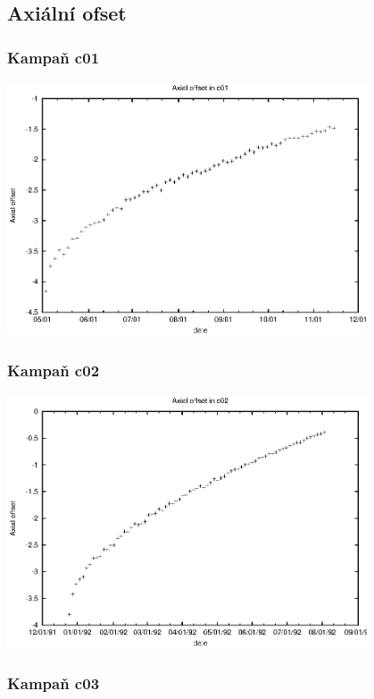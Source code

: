 \documentclass[a4paper,twoside,11pt]{article}
\begin{document}
\subsection{Axiální ofset}



\subsubsection{Kampaň c01}

\begin{center}
\includegraphics[width=0.8\textwidth]{data_c01_ao.eps}
\end{center}


\subsubsection{Kampaň c02}

\begin{center}
\includegraphics[width=0.8\textwidth]{data_c02_ao.eps}
\end{center}


\subsubsection{Kampaň c03}
\end{document}
